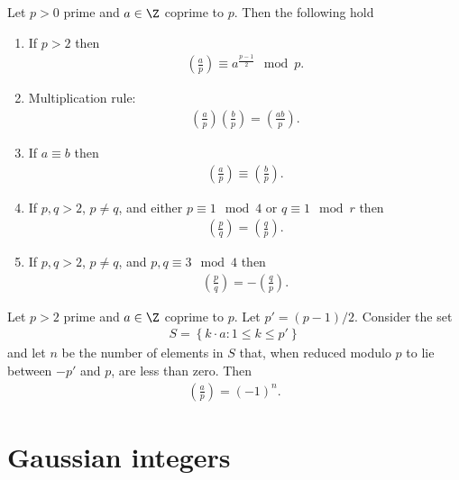 \documentclass{article}
\begin{document}
\begin{theorem}[Lecture 11]
    Let $p>0$ prime and $a\in\Z$ coprime to $p$. Then the following hold 
    \begin{enumerate}
        \item If $p>2$ then \begin{align*}
            \left(\frac{a}{p}\right)\equiv a^{\frac{p-1}{2}} \mod p.
        \end{align*}
        \item Multiplication rule: \begin{align*}
            \left(\frac{a}{p}\right)\left(\frac{b}{p}\right)=\left(\frac{ab}{p}\right).
        \end{align*}
        \item If $a\equiv b$ then \begin{align*}
            \left(\frac{a}{p}\right)\equiv\left(\frac{b}{p}\right).
        \end{align*}
        \item If $p,q>2$, $p\not=q$, and either $p\equiv 1\mod 4$ or $q\equiv 1\mod r$ then \begin{align*}
            \left(\frac{p}{q}\right)=\left(\frac{q}{p}\right).
        \end{align*}
        \item If $p,q>2$, $p\not=q$, and $p,q\equiv 3\mod 4$ then \begin{align*}
            \left(\frac{p}{q}\right)=-\left(\frac{q}{p}\right).
        \end{align*}
    \end{enumerate}
\end{theorem}

\begin{lemma}[Gauss]
    Let $p>2$ prime and $a\in\Z$ coprime to $p$. Let $p'=(p-1)/2$. Consider the set 
    \begin{align*}
        S=\left\lbrace k\cdot a : 1\leq k\leq p'\right\rbrace
    \end{align*} 
    and let $n$ be the number of elements in $S$ that, when reduced modulo $p$ to lie between
    $-p'$ and $p$, are less than zero. Then 
    \begin{align*}
        \left(\frac{a}{p}\right)=(-1)^n.
    \end{align*}
\end{lemma}

\section{Gaussian integers}
\end{document}
